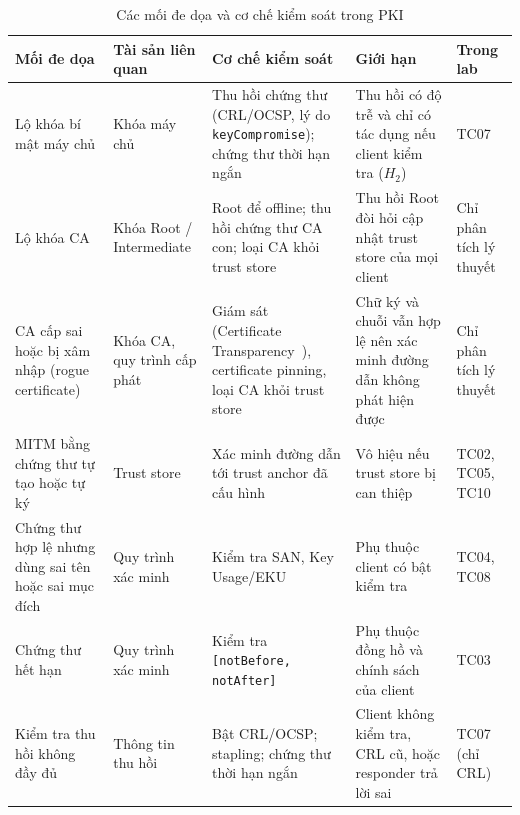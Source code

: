 \begin{table}[!htbp]
\centering
\footnotesize
\setlength{\tabcolsep}{3.5pt}
\renewcommand{\arraystretch}{0.94}
\begin{tabularx}{\textwidth}{>{\raggedright\arraybackslash}p{2.6cm}>{\raggedright\arraybackslash}p{1.9cm}>{\raggedright\arraybackslash}X>{\raggedright\arraybackslash}X>{\raggedright\arraybackslash}p{1.8cm}}
\toprule
\textbf{Mối đe dọa} & \textbf{Tài sản liên quan} & \textbf{Cơ chế kiểm soát} & \textbf{Giới hạn} & \textbf{Trong lab} \\
\midrule
Lộ khóa bí mật máy chủ & Khóa máy chủ & Thu hồi chứng thư (CRL/OCSP, lý do \texttt{keyCompromise}); chứng thư thời hạn ngắn & Thu hồi có độ trễ và chỉ có tác dụng nếu client kiểm tra ($H_2$) & TC07 \\
\midrule
Lộ khóa CA & Khóa Root / Intermediate & Root để offline; thu hồi chứng thư CA con; loại CA khỏi trust store & Thu hồi Root đòi hỏi cập nhật trust store của mọi client & Chỉ phân tích lý thuyết \\
\midrule
CA cấp sai hoặc bị xâm nhập (rogue certificate) & Khóa CA, quy trình cấp phát & Giám sát (Certificate Transparency~\cite{rfc9162}), certificate pinning, loại CA khỏi trust store & Chữ ký và chuỗi vẫn hợp lệ nên xác minh đường dẫn không phát hiện được & Chỉ phân tích lý thuyết \\
\midrule
MITM bằng chứng thư tự tạo hoặc tự ký & Trust store & Xác minh đường dẫn tới trust anchor đã cấu hình & Vô hiệu nếu trust store bị can thiệp & TC02, TC05, TC10 \\
\midrule
Chứng thư hợp lệ nhưng dùng sai tên hoặc sai mục đích & Quy trình xác minh & Kiểm tra SAN, Key Usage/EKU & Phụ thuộc client có bật kiểm tra & TC04, TC08 \\
\midrule
Chứng thư hết hạn & Quy trình xác minh & Kiểm tra \texttt{[notBefore, notAfter]} & Phụ thuộc đồng hồ và chính sách của client & TC03 \\
\midrule
Kiểm tra thu hồi không đầy đủ & Thông tin thu hồi & Bật CRL/OCSP; stapling; chứng thư thời hạn ngắn & Client không kiểm tra, CRL cũ, hoặc responder trả lời sai & TC07 (chỉ CRL) \\
\bottomrule
\end{tabularx}
\caption{Các mối đe dọa và cơ chế kiểm soát trong PKI}
\label{tab:pki-threats}
\end{table}
